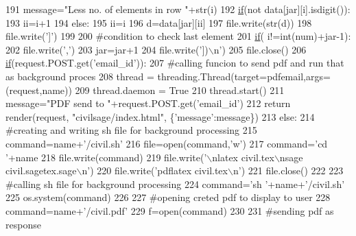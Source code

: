 \begin{DoxyCode}
191                 message=\textcolor{stringliteral}{"Less no. of elements in row "}+str(i)
192                 \hyperlink{a00029_ac2d69f5011896c6ed4a54e0dd36f6334}{if}(\textcolor{keywordflow}{not} data[jar][i].isdigit()):
193                     ii=i+1
194                 \textcolor{keywordflow}{else}:
195                     ii=i
196                 d=data[jar][ii]
197                 file.write(str(d))
198                 file.write(\textcolor{stringliteral}{']'})
199 
200                 \textcolor{comment}{#condition to check last element}
201                 \hyperlink{a00029_ac2d69f5011896c6ed4a54e0dd36f6334}{if}( i!=int(num)+jar-1):
202                     file.write(\textcolor{stringliteral}{','})
203             jar=jar+1
204             file.write(\textcolor{stringliteral}{'])\(\backslash\)n'})
205         file.close()
206         \hyperlink{a00029_ac2d69f5011896c6ed4a54e0dd36f6334}{if}(request.POST.get(\textcolor{stringliteral}{'email\_id'})):
207             \textcolor{comment}{#calling funcion to send pdf and run that as background proces}
208             thread = threading.Thread(target=pdfemail,args=(request,name))
209             thread.daemon = \textcolor{keyword}{True}
210             thread.start()
211             message=\textcolor{stringliteral}{"PDF send to "}+request.POST.get(\textcolor{stringliteral}{'email\_id'})
212             \textcolor{keywordflow}{return} render(request, \textcolor{stringliteral}{"civilsage/index.html"}, \{\textcolor{stringliteral}{'message'}:message\})
213         \textcolor{keywordflow}{else}:
214             \textcolor{comment}{#creating and writing sh file for background processing}
215             command=name+\textcolor{stringliteral}{'/civil.sh'}
216             file=open(command,\textcolor{stringliteral}{'w'})
217             command=\textcolor{stringliteral}{'cd '}+name
218             file.write(command)
219             file.write(\textcolor{stringliteral}{'\(\backslash\)nlatex civil.tex\(\backslash\)nsage civil.sagetex.sage\(\backslash\)n'})
220             file.write(\textcolor{stringliteral}{'pdflatex civil.tex\(\backslash\)n'})
221             file.close()
222 
223             \textcolor{comment}{#calling sh file for background processing}
224             command=\textcolor{stringliteral}{'sh '}+name+\textcolor{stringliteral}{'/civil.sh'}
225             os.system(command)
226 
227             \textcolor{comment}{#opening creted pdf to display to user}
228             command=name+\textcolor{stringliteral}{'/civil.pdf'}
229             f=open(command)
230 
231             \textcolor{comment}{#sending pdf as response}

\end{DoxyCode}
